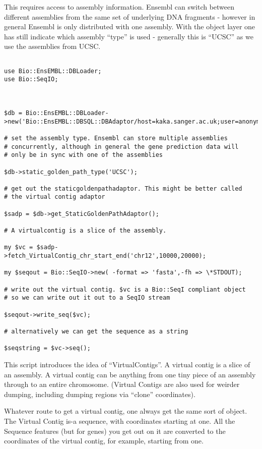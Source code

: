 \documentclass[11pt,a4paper]{article}
\begin{document}
This requires access to assembly information. Ensembl can switch
between different assemblies from the same set of underlying DNA
fragments - however in general Ensembl is only distributed with
one assembly. With the object layer one has still indicate which
assembly ``type'' is used - generally this is ``UCSC'' as we use
the assemblies from UCSC.


\begin{verbatim}

use Bio::EnsEMBL::DBLoader;
use Bio::SeqIO;



$db = Bio::EnsEMBL::DBLoader->new('Bio::EnsEMBL::DBSQL::DBAdaptor/host=kaka.sanger.ac.uk;user=anonymous;dbname=current');

# set the assembly type. Ensembl can store multiple assemblies
# concurrently, although in general the gene prediction data will
# only be in sync with one of the assemblies

$db->static_golden_path_type('UCSC');

# get out the staticgoldenpathadaptor. This might be better called
# the virtual contig adaptor

$sadp = $db->get_StaticGoldenPathAdaptor();

# A virtualcontig is a slice of the assembly.

my $vc = $sadp->fetch_VirtualContig_chr_start_end('chr12',10000,20000);

my $seqout = Bio::SeqIO->new( -format => 'fasta',-fh => \*STDOUT);

# write out the virtual contig. $vc is a Bio::SeqI compliant object
# so we can write out it out to a SeqIO stream

$seqout->write_seq($vc);

# alternatively we can get the sequence as a string

$seqstring = $vc->seq();

\end{verbatim}

This script introduces the idea of ``VirtualContigs''. A virtual contig is a
slice of an assembly. A virtual contig can be anything from one tiny piece
of an assembly through to an entire chromosome. (Virtual Contigs are also used
for weirder dumping, including dumping regions via ``clone'' coordinates).

Whatever route to get a virtual contig, one always get the same sort
of object.  The Virtual Contig is-a sequence, with coordinates
starting at one. All the Sequence features (but for genes) you get out
on it are converted to the coordinates of the virtual contig, for example,
starting from one. 
\end{document}
